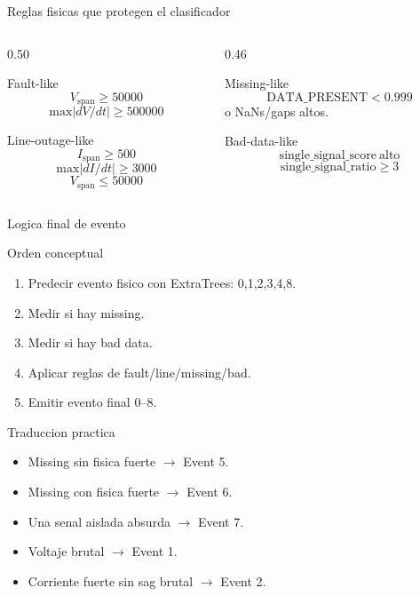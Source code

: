 \documentclass[10pt,aspectratio=169]{beamer}
\begin{document}
\begin{frame}{Reglas fisicas que protegen el clasificador}
\small
\begin{columns}[T,totalwidth=\textwidth]
\begin{column}{0.50\textwidth}
\begin{block}{Fault-like}
\[
V_{\mathrm{span}} \geq 50000
\]
\[
\mathrm{max}|dV/dt| \geq 500000
\]
\end{block}
\begin{block}{Line-outage-like}
\[
I_{\mathrm{span}} \geq 500
\]
\[
\mathrm{max}|dI/dt| \geq 3000
\]
\[
V_{\mathrm{span}} \leq 50000
\]
\end{block}
\end{column}
\begin{column}{0.46\textwidth}
\begin{alertblock}{Missing-like}
\[
\mathrm{DATA\_PRESENT} < 0.999
\]
o NaNs/gaps altos.
\end{alertblock}
\begin{alertblock}{Bad-data-like}
\[
\mathrm{single\_signal\_score}\ \text{alto}
\]
\[
\mathrm{single\_signal\_ratio} \geq 3
\]
\end{alertblock}
\end{column}
\end{columns}
\end{frame}

\begin{frame}{Logica final de evento}
\small
\begin{block}{Orden conceptual}
\begin{enumerate}
  \item Predecir evento fisico con ExtraTrees: 0,1,2,3,4,8.
  \item Medir si hay missing.
  \item Medir si hay bad data.
  \item Aplicar reglas de fault/line/missing/bad.
  \item Emitir evento final 0--8.
\end{enumerate}
\end{block}
\begin{exampleblock}{Traduccion practica}
\begin{itemize}
  \item Missing sin fisica fuerte $\rightarrow$ Event 5.
  \item Missing con fisica fuerte $\rightarrow$ Event 6.
  \item Una senal aislada absurda $\rightarrow$ Event 7.
  \item Voltaje brutal $\rightarrow$ Event 1.
  \item Corriente fuerte sin sag brutal $\rightarrow$ Event 2.
\end{itemize}
\end{exampleblock}
\end{frame}
\end{document}
